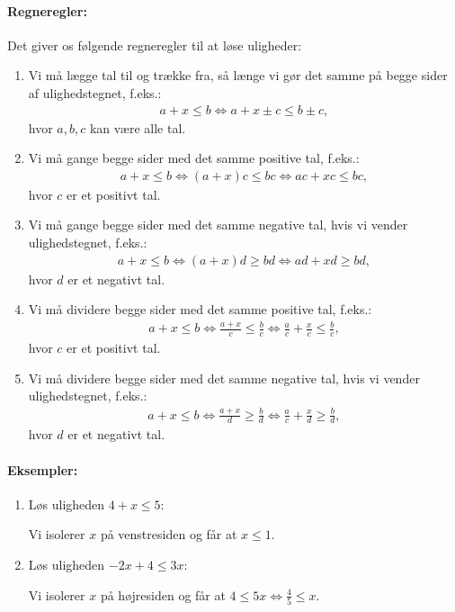 \paragraph*{Regneregler:} 
Det giver os følgende regneregler til at løse uligheder:
\begin{enumerate}
\item Vi må lægge tal til og trække fra, så længe vi gør det samme på begge sider af ulighedstegnet, f.eks.:
\begin{align*}
a + x \leq b \Leftrightarrow a+x \pm c \leq b \pm c, 
\end{align*}
hvor $a,b,c$ kan være alle tal.
\item Vi må gange begge sider med det samme positive tal, f.eks.:
\begin{align*}
a + x \leq b \Leftrightarrow (a + x)c \leq bc \Leftrightarrow ac + xc \leq bc, 
\end{align*}
hvor $c$ er et positivt tal.
\item Vi må gange begge sider med det samme negative tal, hvis vi vender ulighedstegnet, f.eks.:
\begin{align*}
a + x \leq b \Leftrightarrow (a + x)d \geq bd \Leftrightarrow ad + xd \geq bd, 
\end{align*}
hvor $d$ er et negativt tal.
\item Vi må dividere begge sider med det samme positive tal, f.eks.:
\begin{align*}
a + x \leq b \Leftrightarrow \frac{a+x}{c} \leq \frac{b}{c} \Leftrightarrow \frac{a}{c}  + \frac{x}{c} \leq \frac{b}{c},
\end{align*}
hvor $c$ er et positivt tal.
\item Vi må dividere begge sider med det samme negative tal, hvis vi vender ulighedstegnet, f.eks.:
\begin{align*}
a + x \leq b \Leftrightarrow \frac{a+x}{d} \geq \frac{b}{d} \Leftrightarrow \frac{a}{c}  + \frac{x}{d} \geq \frac{b}{d},
\end{align*}
hvor $d$ er et negativt tal.
\end{enumerate}

\paragraph*{Eksempler:}
\begin{enumerate}
\item Løs uligheden $4+x \leq 5$:

Vi isolerer $x$ på venstresiden og får at $x \leq 1$.
\item Løs uligheden $-2x+4 \leq 3x$:

Vi isolerer $x$ på højresiden og får at $4 \leq 5x \Leftrightarrow \frac{4}{5} \leq x$.
\end{enumerate}


